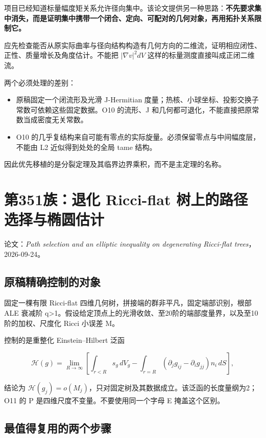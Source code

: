 \documentclass[UTF8,11pt,fontset=none]{ctexart}
\providecommand{\tightlist}{\setlength{\itemsep}{1pt}\setlength{\parskip}{0pt}}
\begin{document}
项目已经知道标量幅度矩关系允许径向集中。该论文提供另一种思路：\textbf{不先要求集中消失，而是证明集中携带一个闭合、定向、可配对的几何对象，再用拓扑关系限制它。}

应先检查能否从原实际曲率与径向结构构造有几何方向的二维流，证明相应闭性、正性、质量增长及角度估计。不能把 \(|\nabla v|^2dV\) 这样的标量测度直接叫成正闭二维流。

两个必须处理的差别：

\begin{itemize}
\tightlist
\item
  原稿固定一个闭流形及光滑 J-Hermitian 度量；热核、小球坐标、投影交换子常数可依赖这些固定数据。O10 的流形、J 和几何都可退化，不能直接把原常数当成密度无关常数。
\item
  O10 的几乎复结构来自可能有零点的实际旋量。必须保留零点与中间幅度层，不能由 L2 近似得到处处的全局 tame 结构。
\end{itemize}

因此优先移植的是分裂定理及其临界边界乘积，而不是主定理的名称。

\section{第351族：退化 Ricci-flat 树上的路径选择与椭圆估计}\label{ch6:ux7b2c351ux65cfux9000ux5316-ricci-flat-ux6811ux4e0aux7684ux8defux5f84ux9009ux62e9ux4e0eux692dux5706ux4f30ux8ba1}

论文：\emph{Path selection and an elliptic inequality on degenerating Ricci-flat trees}，2026-09-24。\cite{OAITree}

\subsection{原稿精确控制的对象}\label{ch6:ux539fux7a3fux7cbeux786eux63a7ux5236ux7684ux5bf9ux8c61}

固定一棵有限 Ricci-flat 四维几何树，拼接端的群非平凡，固定端部识别，根部 ALE 衰减阶 q\textgreater1。假设给定顶点上的光滑收敛、至20阶的端部度量界，以及至10阶的加权、尺度化 Ricci 小误差 M。

控制的是重整化 Einstein--Hilbert 泛函

\[
\mathscr H(g)=\lim_{R\to\infty}
\left[\int_{r<R}s_g\,dV_g-
\int_{r=R}(\partial_jg_{ij}-\partial_ig_{jj})n_i\,dS\right],
\]

结论为 \(\mathscr H(g_j)=o(M_j)\)，只对固定树及其数据成立。该泛函的长度量纲为2；O11 的 P 是四维尺度不变量。不要使用同一个字母 E 掩盖这个区别。

\subsection{最值得复用的两个步骤}\label{ch6:ux6700ux503cux5f97ux590dux7528ux7684ux4e24ux4e2aux6b65ux9aa4}
\end{document}
